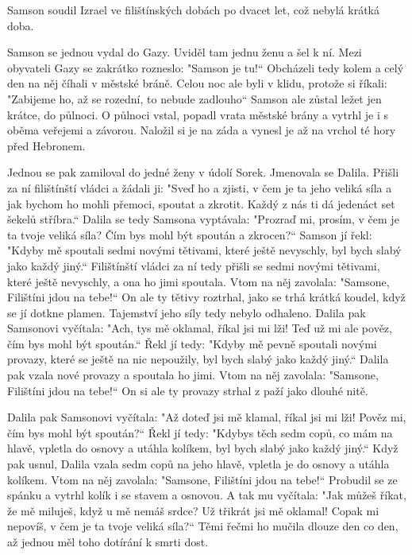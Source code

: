 \documentclass{article}
\begin{document}
Samson soudil Izrael ve filištínských dobách po dvacet let, což nebylá krátká doba. \\
\par Samson se jednou vydal do Gazy. Uviděl tam jednu ženu a šel k ní. Mezi obyvateli Gazy se zakrátko rozneslo: "Samson je tu!“ Obcházeli tedy kolem a celý den na něj číhali v městské bráně. Celou noc ale byli v klidu, protože si říkali: "Zabijeme ho, až se rozední, to nebude zadlouho“
Samson ale zůstal ležet jen krátce, do půlnoci. O půlnoci vstal, popadl vrata městské brány a vytrhl je i s oběma veřejemi a závorou. Naložil si je na záda a vynesl je až na vrchol té hory před Hebronem.
\medskip
\par Jednou se pak zamiloval do jedné ženy v údolí Sorek. Jmenovala se Dalila. Přišli za ní filištínští vládci a žádali ji: "Sveď ho a zjisti, v čem je ta jeho veliká síla a jak bychom ho mohli přemoci, spoutat a zkrotit. Každý z nás ti dá jedenáct set šekelů stříbra.“
Dalila se tedy Samsona vyptávala: "Prozraď mi, prosím, v čem je ta tvoje veliká síla? Čím bys mohl být spoután a zkrocen?“
Samson jí řekl: "Kdyby mě spoutali sedmi novými tětivami, které ještě nevyschly, byl bych slabý jako každý jiný.“
Filištínští vládci za ní tedy přišli se sedmi novými tětivami, které ještě nevyschly, a ona ho jimi spoutala. Vtom na něj zavolala: "Samsone, Filištíni jdou na tebe!“ On ale ty tětivy roztrhal, jako se trhá krátká koudel, když se jí dotkne plamen. Tajemství jeho síly tedy nebylo odhaleno.
Dalila pak Samsonovi vyčítala: "Ach, tys mě oklamal, říkal jsi mi lži! Teď už mi ale pověz, čím bys mohl být spoután.“
Řekl jí tedy: "Kdyby mě pevně spoutali novými provazy, které se ještě na nic nepoužily, byl bych slabý jako každý jiný.“
Dalila pak vzala nové provazy a spoutala ho jimi. Vtom na něj zavolala: "Samsone, Filištíni jdou na tebe!“  On si ale ty provazy strhal z paží jako dlouhé nitě.
\medskip
\par Dalila pak Samsonovi vyčítala: "Až doteď jsi mě klamal, říkal jsi mi lži! Pověz mi, čím bys mohl být spoután?“ Řekl jí tedy: "Kdybys těch sedm copů, co mám na hlavě, vpletla do osnovy a utáhla kolíkem, byl bych slabý jako každý jiný.“
Když pak usnul, Dalila vzala sedm copů na jeho hlavě, vpletla je do osnovy a utáhla kolíkem. Vtom na něj zavolala: "Samsone, Filištíni jdou na tebe!“ Probudil se ze spánku a vytrhl kolík i se stavem a osnovou.
A tak mu vyčítala: "Jak můžeš říkat, že mě miluješ, když u mě nemáš srdce? Už třikrát jsi mě oklamal! Copak mi nepovíš, v čem je ta tvoje veliká síla?“ Těmi řečmi ho mučila dlouze den co den, až jednou měl toho dotírání k smrti dost.
\end{document}
